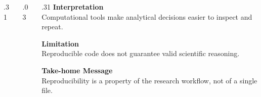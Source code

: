 \documentclass[final]{beamer}
\begin{document}
\begin{frame}[t]
\begin{columns}[t,totalwidth=\textwidth]
\begin{column}{.31\textwidth}
\end{column}

\begin{column}{.03\textwidth}
\end{column}
%
    \begin{column}{.31\textwidth}
    {\LARGE\bfseries Interpretation}\\[.3cm]
    Computational tools make analytical decisions easier to inspect and repeat.
    \vspace{.8cm}
    
    {\LARGE\bfseries Limitation}\\[.3cm]
    Reproducible code does not guarantee valid scientific reasoning.
    \vspace{.8cm}
    
    {\LARGE\bfseries Take-home Message}\\[.3cm]
    Reproducibility is a property of the research workflow, not of a single file.
    \lipsum[1-4]
    \begin{center}
\end{center}
    \end{column}
\end{columns}
\end{frame}
\end{document}
